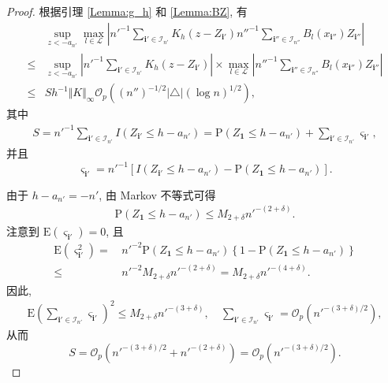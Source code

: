 \documentclass[a4paper,openay,14pt]{ctexbook}
\numberwithin{equation}{section}
\numberwithin{lem}{section}
\begin{document}
\begin{proof}
    根据引理 \ref{Lemma:g_h} 和 \ref{Lemma:BZ}, 有
        \begin{align*}
            &\sup_{ z < -a_{n'}}\max_{l\in\mathcal{L}}\left\vert n'^{-1}\sum_{\mathbf{i}'\in\mathcal{I}_{n'}}K_h(z-Z_{\mathbf{i}'})n''^{-1}\sum_{\mathbf{i}''\in\mathcal{I}_{n''}}B_{l}\left(x_{\mathbf{i}''}\right)Z_{\mathbf{i}''}\right\vert\\
            \leq &\sup_{ z < -a_{n'}}\left\vert n'^{-1}\sum_{\mathbf{i}'\in\mathcal{I}_{n'}}K_h(z-Z_{\mathbf{i}'})\right\vert 
            \times \max_{l\in\mathcal{L}} \left\vert n''^{-1}\sum_{\mathbf{i}''\in\mathcal{I}_{n''}}B_{l}\left(x_{\mathbf{i}''}\right)Z_{\mathbf{i}''}\right\vert\\
            \leq &Sh^{-1}\Vert K\Vert_{\infty}\mathcal{O}_p\left((n'')^{-1/2}\vert\triangle\vert(\log n)^{1/2}\right),
        \end{align*}
        其中
        \begin{align*}
            S = n'^{-1}\sum_{\mathbf{i}'\in\mathcal{I}_{n'}}I\left(Z_{\mathbf{i}'}\leq h-a_{n'}\right)
            = \mathrm{P}(Z_{\mathbf{1}}\leq h-a_{n'})+\sum_{\mathbf{i}'\in\mathcal{I}_{n'}}\varsigma _{\mathbf{i}'},
        \end{align*}
        并且
        \[
        \varsigma _{\mathbf{i}'} = n'^{-1}\left[I\left(Z_{\mathbf{i}'}\leq h-a_{n'}\right) - \mathrm{P}\left(Z_{\mathbf{1}}\leq h-a_{n'}\right)\right].
        \]

        由于 $h-a_{n'} = -n'$, 由 Markov 不等式可得
        \begin{align*}
            \mathrm{P}(Z_\mathbf{1}\leq h-a_{n'}) \leq M_{2+\delta}n'^{-(2+\delta)}.
        \end{align*}
        注意到 $\mathrm{E}(\varsigma_{\mathbf{i}'}) = 0$, 且
        \begin{align*}
            \mathrm{E}(\varsigma_{\mathbf{i}'}^2) 
            =&\, n'^{-2}\mathrm{P}(Z_{\mathbf{1}}\leq h-a_{n'})
            \left\{1-\mathrm{P}(Z_{\mathbf{1}}\leq h-a_{n'})\right\}\\
            \leq &\, n'^{-2}M_{2+\delta}n'^{-(2+\delta)}
            = M_{2+\delta}n'^{-(4+\delta)}.
        \end{align*}
        因此,
        \begin{align*}
     \mathrm{E}\left(\sum_{\mathbf{i}'\in\mathcal{I}_{n'}}\varsigma_{\mathbf{i}'}\right)^2
     \leq M_{2+\delta}n'^{-(3+\delta)}, \quad
     \sum_{\mathbf{i}'\in\mathcal{I}_{n'}}\varsigma_{\mathbf{i}'}
     = \mathcal{O}_p\left(n'^{-(3+\delta)/2}\right),
        \end{align*}
        从而
        \[
        S = \mathcal{O}_p\left(n'^{-(3+\delta)/2}+n'^{-(2+\delta)}\right)
        = \mathcal{O}_p\left(n'^{-(3+\delta)/2}\right).
        \]


\end{proof}
\end{document}
